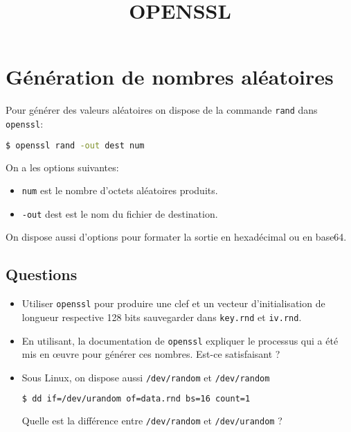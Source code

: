 \documentclass{article}
\title{OPENSSL}
\begin{document}
\maketitle
\section{Génération de nombres aléatoires}

Pour générer des valeurs aléatoires on dispose de la commande \texttt{rand} dans \texttt{openssl}: 
\begin{lstlisting}[language=bash]
$ openssl rand -out dest num

\end{lstlisting}

On a les options suivantes:
\begin{itemize}
\item \texttt{num} est le nombre d’octets aléatoires produits.
\item \texttt{-out} dest est le nom du fichier de destination.
\end{itemize}

On dispose aussi d’options pour formater la sortie en hexadécimal ou en base64.

\subsection*{Questions}
\begin{itemize}

\item Utiliser \texttt{openssl} pour produire une clef et un vecteur d’initialisation de longueur respective
128 bits sauvegarder dans \texttt{key.rnd} et \texttt{iv.rnd}.
\item En utilisant, la documentation de \texttt{openssl} expliquer le processus qui a été mis en œuvre pour générer ces nombres. Est-ce satisfaisant ?



\item Sous Linux, on dispose aussi \texttt{/dev/random} et \texttt{/dev/random}

\begin{lstlisting}[language=bash]
$ dd if=/dev/urandom of=data.rnd bs=16 count=1
\end{lstlisting}

Quelle est la différence entre \texttt{/dev/random} et \texttt{/dev/urandom} ?


\end{itemize}
\end{document}
